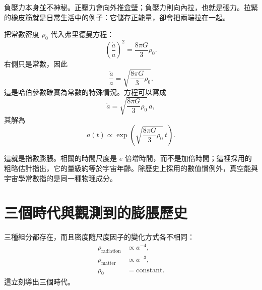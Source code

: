 負壓力本身並不神秘。正壓力會向外推盒壁；負壓力則向內拉，也就是張力。拉緊的橡皮筋就是日常生活中的例子：它儲存正能量，卻會把兩端拉在一起。

把常數密度 \(\rho_0\) 代入弗里德曼方程：
\begin{equation}
\left(\frac{\dot a}{a}\right)^2=\frac{8\pi G}{3}\rho_0.
\end{equation}
右側只是常數，因此
\begin{equation}
\frac{\dot a}{a}=\sqrt{\frac{8\pi G}{3}\rho_0}.
\end{equation}
這是哈伯參數確實為常數的特殊情況。方程可以寫成
\begin{equation}
\dot a=\sqrt{\frac{8\pi G}{3}\rho_0}\,a,
\end{equation}
其解為
\begin{equation}
a(t)\propto \exp\!\left(\sqrt{\frac{8\pi G}{3}\rho_0}\,t\right).
\end{equation}

這就是指數膨脹。相關的時間尺度是 \(e\) 倍增時間，而不是加倍時間；這裡採用的粗略估計指出，它的量級約等於宇宙年齡。除歷史上採用的數值慣例外，真空能與宇宙學常數指的是同一種物理成分。

\begin{classroomqa}
\end{classroomqa}

\begin{classroomqa}
\end{classroomqa}

\section{三個時代與觀測到的膨脹歷史}

三種組分都存在，而且密度隨尺度因子的變化方式各不相同：
\begin{equation}
\begin{aligned}
\rho_{\text{radiation}}&\propto a^{-4},\\
\rho_{\text{matter}}&\propto a^{-3},\\
\rho_0&=\text{constant}.
\end{aligned}
\end{equation}
這立刻導出三個時代。

